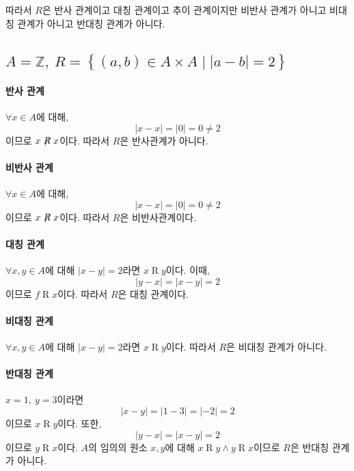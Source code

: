 \documentclass{oblivoir}
\begin{document}
따라서 $R$은 반사 관계이고 대칭 관계이고 추이 관계이지만
비반사 관계가 아니고 비대칭 관계가 아니고 반대칭 관계가 아니다.

\subsection{$A = \mathbb Z,\ R = \left\{ (a,b) \in A \times A \mid |a-b| = 2 \right\}$}

\paragraph{반사 관계}
$\forall x \in A$에 대해,
\begin{equation}
    |x - x| = |0| = 0 \neq 2
\end{equation}이므로
$x \not \mathrel R x$이다.
따라서 $R$은 반사관계가 아니다.

\paragraph{비반사 관계}
$\forall x \in A$에 대해,
\begin{equation}
    |x - x| = |0| = 0 \neq 2
\end{equation}이므로
$x \not \mathrel R x$이다.
따라서 $R$은 비반사관계이다.

\paragraph{대칭 관계}
$\forall x, y \in A$에 대해 $|x - y| = 2$라면 $x \mathrel R y$이다.
이때,
\begin{equation}
    |y - x| = |x - y| = 2
\end{equation}
이므로 $f \mathrel R x$이다.
따라서 $R$은 대칭 관계이다.

\paragraph{비대칭 관계}
$\forall x, y \in A$에 대해 $|x - y| = 2$라면 $x \mathrel R y$이다.
따라서 $R$은 비대칭 관계가 아니다.

\paragraph{반대칭 관계}
$x = 1,\ y = 3$이라면
\begin{equation}
    |x - y| = |1 - 3| = |-2| = 2
\end{equation}
이므로 $x \mathrel R y$이다.
또한,
\begin{equation}
    |y - x| = |x - y| = 2
\end{equation}
이므로 $y \mathrel R x$이다.
$A$의 임의의 원소 $x, y$에 대해 $x \mathrel R y \wedge y \mathrel R x$이므로
$R$은 반대칭 관계가 아니다.
\end{document}

